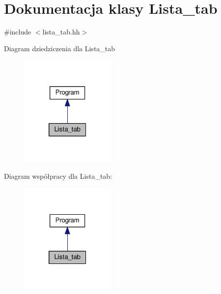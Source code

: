 \hypertarget{class_lista__tab}{\section{Dokumentacja klasy Lista\-\_\-tab}
\label{class_lista__tab}
}


{\ttfamily \#include $<$lista\-\_\-tab.\-hh$>$}



Diagram dziedziczenia dla Lista\-\_\-tab\nopagebreak
\begin{figure}[H]
\begin{center}
\leavevmode
\includegraphics[width=134pt]{class_lista__tab__inherit__graph}
\end{center}
\end{figure}


Diagram współpracy dla Lista\-\_\-tab\-:\nopagebreak
\begin{figure}[H]
\begin{center}
\leavevmode
\includegraphics[width=134pt]{class_lista__tab__coll__graph}
\end{center}
\end{figure}
